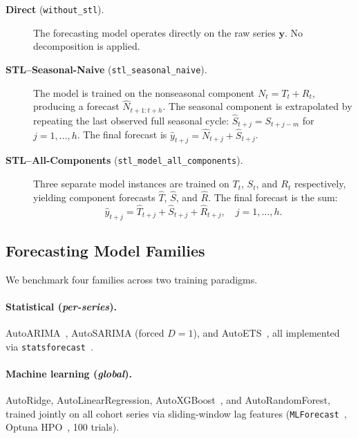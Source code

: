 \documentclass[pdflatex,sn-mathphys-num]{sn-jnl}
\theoremstyle{thmstyleone}
\theoremstyle{thmstyletwo}
\theoremstyle{thmstylethree}
\begin{document}
\begin{description}
  \item[\textbf{Direct} (\texttt{without\_stl}).] The forecasting model operates
    directly on the raw series $\mathbf{y}$. No decomposition is applied.

  \item[\textbf{STL--Seasonal-Naive} (\texttt{stl\_seasonal\_naive}).] The model
    is trained on the nonseasonal component $N_t = T_t + R_t$, producing a
    forecast $\hat{N}_{t+1:t+h}$. The seasonal component is extrapolated by
    repeating the last observed full seasonal cycle:
    $\hat{S}_{t+j} = S_{t+j-m}$ for $j = 1, \ldots, h$.
    The final forecast is $\hat{y}_{t+j} = \hat{N}_{t+j} + \hat{S}_{t+j}$.

  \item[\textbf{STL--All-Components} (\texttt{stl\_model\_all\_components}).] Three
    separate model instances are trained on $T_t$, $S_t$, and $R_t$ respectively,
    yielding component forecasts $\hat{T}$, $\hat{S}$, and $\hat{R}$.
    The final forecast is the sum:
    \begin{equation}
      \hat{y}_{t+j} = \hat{T}_{t+j} + \hat{S}_{t+j} + \hat{R}_{t+j},
      \quad j = 1, \ldots, h.
      \label{eq:recompose}
    \end{equation}
\end{description}

\subsection{Forecasting Model Families}\label{sec:models}

We benchmark four families across two training paradigms.

\paragraph{Statistical (\textit{per-series}).}
AutoARIMA~\cite{hyndman2008automatic}, AutoSARIMA (forced $D=1$), and
AutoETS~\cite{hyndman2008exponential}, all implemented via
\texttt{statsforecast}~\cite{olivares2022statsforecast}.

\paragraph{Machine learning (\textit{global}).}
AutoRidge, AutoLinearRegression, AutoXGBoost~\cite{chen2016xgboost}, and
AutoRandomForest, trained jointly on all cohort series via sliding-window
lag features (\texttt{MLForecast}~\cite{garza2022mlforecast}, Optuna
HPO~\cite{akiba2019optuna}, 100 trials).
\end{document}
